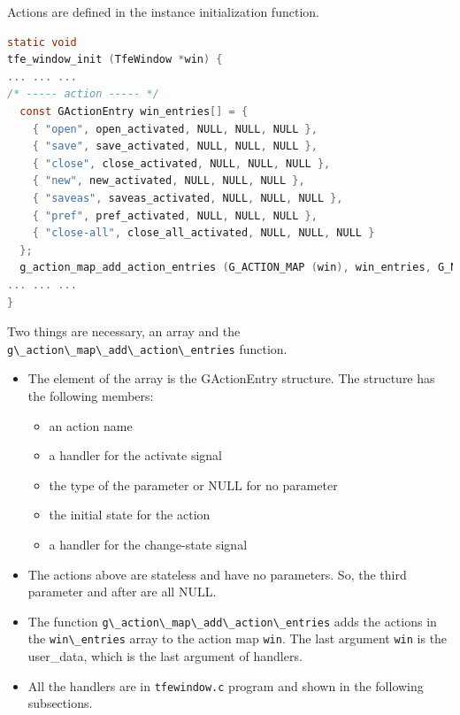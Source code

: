 Actions are defined in the instance initialization function.

\begin{lstlisting}[language=C]
static void
tfe_window_init (TfeWindow *win) {
... ... ...
/* ----- action ----- */
  const GActionEntry win_entries[] = {
    { "open", open_activated, NULL, NULL, NULL },
    { "save", save_activated, NULL, NULL, NULL },
    { "close", close_activated, NULL, NULL, NULL },
    { "new", new_activated, NULL, NULL, NULL },
    { "saveas", saveas_activated, NULL, NULL, NULL },
    { "pref", pref_activated, NULL, NULL, NULL },
    { "close-all", close_all_activated, NULL, NULL, NULL }
  };
  g_action_map_add_action_entries (G_ACTION_MAP (win), win_entries, G_N_ELEMENTS (win_entries), win);
... ... ...
}
\end{lstlisting}

Two things are necessary, an array and the
\passthrough{\lstinline!g\_action\_map\_add\_action\_entries!} function.

\begin{itemize}
\tightlist
\item
  The element of the array is the GActionEntry structure. The structure
  has the following members:

  \begin{itemize}
  \tightlist
  \item
    an action name
  \item
    a handler for the activate signal
  \item
    the type of the parameter or NULL for no parameter
  \item
    the initial state for the action
  \item
    a handler for the change-state signal
  \end{itemize}
\item
  The actions above are stateless and have no parameters. So, the third
  parameter and after are all NULL.
\item
  The function
  \passthrough{\lstinline!g\_action\_map\_add\_action\_entries!} adds
  the actions in the \passthrough{\lstinline!win\_entries!} array to the
  action map \passthrough{\lstinline!win!}. The last argument
  \passthrough{\lstinline!win!} is the user\_data, which is the last
  argument of handlers.
\item
  All the handlers are in \passthrough{\lstinline!tfewindow.c!} program
  and shown in the following subsections.
\end{itemize}


